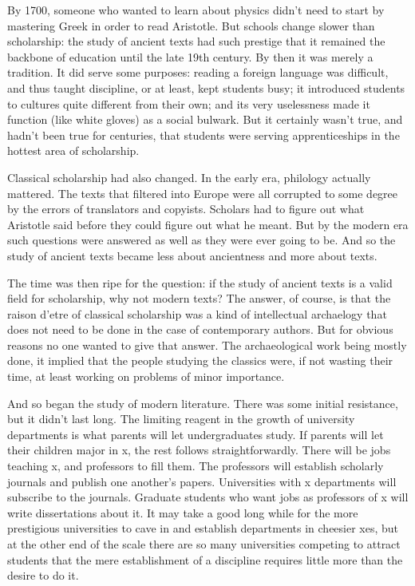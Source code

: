 By 1700, someone who wanted to learn about physics didn't need to start
by mastering Greek in order to read Aristotle. But schools change slower
than scholarship: the study of ancient texts had such prestige that it
remained the backbone of education until the late 19th century. By then
it was merely a tradition. It did serve some purposes: reading a foreign
language was difficult, and thus taught discipline, or at least, kept
students busy; it introduced students to cultures quite different from
their own; and its very uselessness made it function (like white gloves)
as a social bulwark. But it certainly wasn't true, and hadn't been true
for centuries, that students were serving apprenticeships in the hottest
area of scholarship.

Classical scholarship had also changed. In the early era, philology
actually mattered. The texts that filtered into Europe were all
corrupted to some degree by the errors of translators and copyists.
Scholars had to figure out what Aristotle said before they could figure
out what he meant. But by the modern era such questions were answered as
well as they were ever going to be. And so the study of ancient texts
became less about ancientness and more about texts.

The time was then ripe for the question: if the study of ancient texts
is a valid field for scholarship, why not modern texts? The answer, of
course, is that the raison d'etre of classical scholarship was a kind of
intellectual archaelogy that does not need to be done in the case of
contemporary authors. But for obvious reasons no one wanted to give that
answer. The archaeological work being mostly done, it implied that the
people studying the classics were, if not wasting their time, at least
working on problems of minor importance.

And so began the study of modern literature. There was some initial
resistance, but it didn't last long. The limiting reagent in the growth
of university departments is what parents will let undergraduates study.
If parents will let their children major in x, the rest follows
straightforwardly. There will be jobs teaching x, and professors to fill
them. The professors will establish scholarly journals and publish one
another's papers. Universities with x departments will subscribe to the
journals. Graduate students who want jobs as professors of x will write
dissertations about it. It may take a good long while for the more
prestigious universities to cave in and establish departments in
cheesier xes, but at the other end of the scale there are so many
universities competing to attract students that the mere establishment
of a discipline requires little more than the desire to do it.

